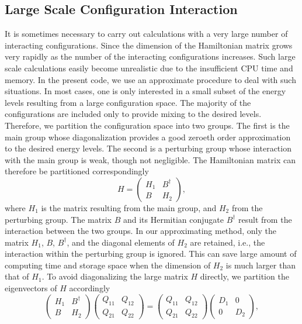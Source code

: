 \documentclass[preprint, floatfix, pra, showpacs, showkeys]{revtex4}
\begin{document}
\subsection{Large Scale Configuration Interaction}
It is sometimes necessary to carry out calculations with a very large number of
interacting configurations. Since the dimension of the Hamiltonian matrix
grows very rapidly as the number of the interacting configurations
increases. Such large
scale calculations easily become unrealistic due to the insufficient CPU time
and memory. In the present code, we use an approximate procedure to deal with
such situations. In most cases, one is only interested in a small subset of the
energy levels resulting from a large configuration space. The
majority of the configurations are included only to provide mixing to the
desired levels. Therefore, we partition the configuration space into two
groups. The first is the main group whose diagonalization provides a good
zeroeth order approximation to the desired energy levels. The second is a
perturbing group whose interaction with the main group is weak, though not
negligible. The Hamiltonian matrix can therefore be partitioned
correspondingly
\begin{equation}
H = \left(\begin{array}{cc}H_1 & B^{\dagger}\\B & H_2\end{array}\right),
\end{equation}
where $H_1$ is the matrix resulting from the main group, and $H_2$ from the
perturbing group. The matrix $B$ and its Hermitian conjugate $B^{\dagger}$
result from the interaction between the two groups. In our approximating
method, only 
the matrix $H_1$, $B$, $B^{\dagger}$, and the diagonal elements of $H_2$ are
retained, i.e., the interaction within the perturbing group is ignored. This
can save large amount of computing time and storage space when the dimension of
$H_2$ is much larger than that of $H_1$. To avoid diagonalizing the large
matrix $H$ directly, we partition the eigenvectors of $H$ accordingly
\begin{equation}
\left(\begin{array}{cc}H_1 & B^{\dagger} \\ B & H_2\end{array}\right) 
\left(\begin{array}{cc}Q_{11} & Q_{12} \\ Q_{21} & Q_{22} \end{array}\right) 
= \left(\begin{array}{cc}Q_{11} & Q_{12} \\ Q_{21} & Q_{22} \end{array}\right)
\left(\begin{array}{cc} D_1 & 0 \\ 0 & D_2 \end{array}\right),
\end{equation}
\end{document}
